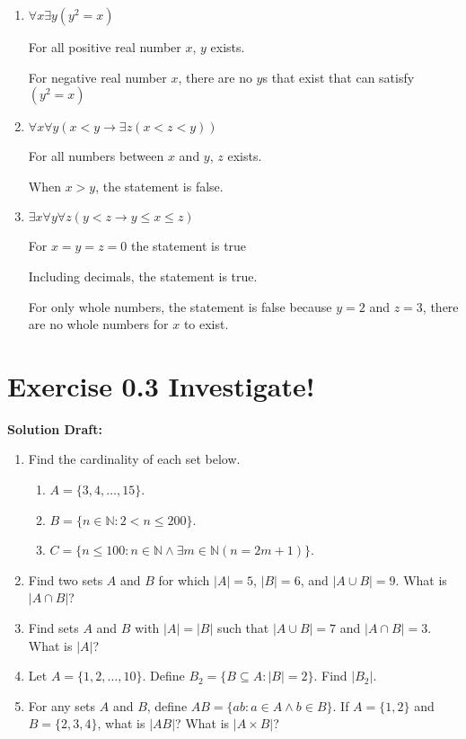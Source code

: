 \documentclass{article}
\begin{document}
\begin{enumerate}[label=\alph*.]
    \item $\forall x \exists y (y^2 = x)$
    
    For all positive real number $x$, $y$ exists.

    For negative real number $x$, there are no $y$s that exist that can satisfy $(y^{2} = x)$
    \item $\forall x \forall y (x < y \to \exists z (x < z < y))$
    
    For all numbers between $x$ and $y$, $z$ exists.

    When $x>y$, the statement is false.
    \item $\exists x \forall y \forall z (y < z \to y \leq x \leq z)$
    
    For $x=y=z=0$ the statement is true

    Including decimals, the statement is true.

    For only whole numbers, the statement is false because $y=2$ and $z=3$, there are no whole numbers for $x$ to exist.


\end{enumerate}

\section*{Exercise 0.3 Investigate!}  

\noindent\textbf{Solution Draft:} 

\begin{enumerate}
    \item Find the cardinality of each set below.
    \begin{enumerate}
        \item \( A = \{3, 4, \ldots, 15\} \).
        \item \( B = \{n \in \mathbb{N} : 2 < n \leq 200\} \).
        \item \( C = \{n \leq 100 : n \in \mathbb{N} \land \exists m \in \mathbb{N}(n = 2m + 1)\} \).
    \end{enumerate}
    
    \item Find two sets \( A \) and \( B \) for which \( |A| = 5 \), \( |B| = 6 \), and \( |A \cup B| = 9 \). What is \( |A \cap B| \)?
    
    \item Find sets \( A \) and \( B \) with \( |A| = |B| \) such that \( |A \cup B| = 7 \) and \( |A \cap B| = 3 \). What is \( |A| \)?
    
    \item Let \( A = \{1, 2, \ldots, 10\} \). Define \( B_2 = \{B \subseteq A : |B| = 2\} \). Find \( |B_2| \).
    
    \item For any sets \( A \) and \( B \), define \( AB = \{ab : a \in A \land b \in B\} \). If \( A = \{1, 2\} \) and \( B = \{2, 3, 4\} \), what is \( |AB| \)? What is \( |A \times B| \)?
\end{enumerate}
\end{document}
